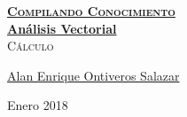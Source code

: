 \documentclass[12pt, fleqn]{report}                             %
\author{Oscar Andrés Rosas & Alan Enrique Ontiveros Salazar}    %
\begin{document}
\begin{titlepage}
    
    \pagecolor{TitlePageColor}                                      %
    \color{white}                                                   %
    \newcommand{\Github}{https://github.com/compilandoconocimiento} %

    \vspace                                                         %
    \baselineskip                                                   %

    \makebox[0pt][l]{\rule{1.3\textwidth}{3pt}}                     %
    
    \href{\Github}                                                  %
    {\textbf{\textsc{\Huge Compilando Conocimiento}}}\\[2.7cm]      %

    \href{\Github/LibroAnalisisVectorial}                           %
    {\fontsize{55}{66}\selectfont                                   %
        \textbf{Análisis Vectorial}}\\[0.5cm]                       %
    \textcolor{ColorSubtext}{\textsc{\Huge Cálculo}}                %
    
    \vfill                                                          %
    
    \href{https://github.com/alaneos777}                            %
    {\LARGE \textsf{Alan Enrique Ontiveros Salazar}}                %

    \vspace                                                         %
    \baselineskip                                                   %
    
    {\large \textsf{Enero 2018}}                                    %

\end{titlepage}
\end{document}
